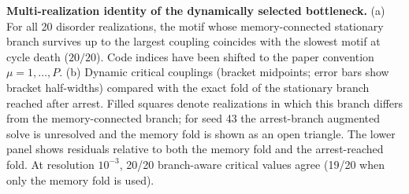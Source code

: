 \textbf{Multi-realization identity of the dynamically selected bottleneck.} (a) For all 20 disorder realizations, the motif whose memory-connected stationary branch survives up to the largest coupling coincides with the slowest motif at cycle death ($20/20$). Code indices have been shifted to the paper convention $\mu=1,\ldots,P$. (b) Dynamic critical couplings (bracket midpoints; error bars show bracket half-widths) compared with the exact fold of the stationary branch reached after arrest. Filled squares denote realizations in which this branch differs from the memory-connected branch; for seed 43 the arrest-branch augmented solve is unresolved and the memory fold is shown as an open triangle. The lower panel shows residuals relative to both the memory fold and the arrest-reached fold. At resolution $10^{-3}$, 20/20 branch-aware critical values agree (19/20 when only the memory fold is used).
